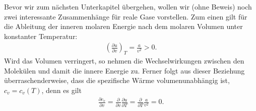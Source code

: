 Bevor wir zum nächsten Unterkapitel übergehen, wollen wir (ohne Beweis) noch zwei interessante Zusammenhänge für reale Gase vorstellen.
Zum einen gilt für die Ableitung der inneren molaren Energie nach dem molaren Volumen unter konstanter Temperatur: 
\begin{align*}
    \left( \frac{\partial u}{\partial v} \right)_T =\frac{a}{v^2}>0.
\end{align*}
Wird das Volumen verringert, so nehmen die Wechselwirkungen zwischen den Molekülen und damit die innere Energie zu.
Ferner folgt aus dieser Beziehung überraschenderweise, dass die spezifische Wärme volumenunabhängig ist, $c_v=c_v(T)$, denn es gilt
\begin{align*}
    \frac{\partial c_v}{\partial v}=\frac{\partial}{\partial v}\frac{\partial u}{\partial T}=\frac{\partial}{\partial T}\frac{a}{v^2}=0.
\end{align*} 

